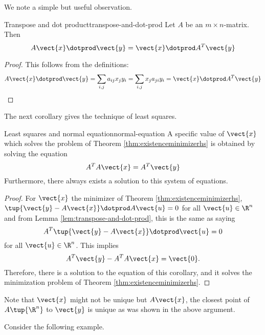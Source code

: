 We note a simple but useful observation.

\begin{lemma}{Transpose and dot product}{transpose-and-dot-prod}
Let $A$ be an $m\times n$-matrix. Then 
\begin{equation*}
A\vect{x} \dotprod \vect{y} = \vect{x}\dotprod A^T\vect{y} 
\end{equation*}
\end{lemma}

\begin{proof}
This follows from the definitions:
\[ A\vect{x} \dotprod \vect{y}=\sum_{i,j}a_{ij}x_{j} y_{i}
=\sum_{i,j}x_{j} a_{ji} y_{i}= \vect{x} \dotprod A^T\vect{y}
\] \end{proof}

The next corollary gives the technique of least squares.

\begin{corollary}{Least squares and normal equation}{normal-equation}
A specific value of $\vect{x}$ which solves the problem of Theorem 
\ref{thm:existenceminimizerhs} is obtained by solving the equation
\begin{equation*}
A^TA\vect{x}=A^T\vect{y}
\end{equation*}
Furthermore, there always exists a solution to this system of equations.
\end{corollary}

\begin{proof} 
For $\vect{x}$ the minimizer of Theorem \ref{thm:existenceminimizerhs}, $\tup{
\vect{y}-A\vect{x}} \dotprod A \vect{u} =0$ for all $\vect{u} \in \R^{n}$ and from
Lemma \ref{lem:transpose-and-dot-prod}, this is the same as saying
\begin{equation*}
A^T\tup{\vect{y}-A\vect{x}} \dotprod \vect{u}=0
\end{equation*}
for all $\vect{u} \in \R^{n}$. This implies 
\begin{equation*}
A^T\vect{y}-A^TA\vect{x}=\vect{0}.
\end{equation*}
Therefore, there is a solution to the equation of this corollary, and it
solves the minimization problem of Theorem \ref{thm:existenceminimizerhs}.
\end{proof}

Note that $\vect{x}$ might not be unique but $A\vect{x}$, the closest
point of $A\tup{\R^{n}}$ to $\vect{y}$ is unique as was shown in the
above argument. 

Consider the following example. 

